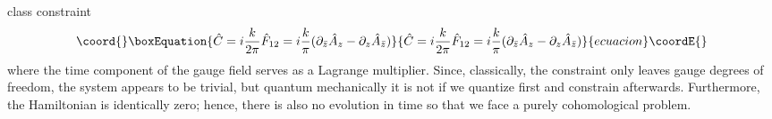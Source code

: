 \documentclass[a4paper,10pt]{article}
\begin{document}
class constraint 
\begin{equation}\coord{}\boxEquation{
\hat{C}=i\frac{k}{2\pi}\hat{F}_{12}=i\frac{k}{\pi}(\partial_{\bar{z}}\hat{A}_z
-\partial_z\hat{A}_{\bar{z}})
}{
\hat{C}=i\frac{k}{2\pi}\hat{F}_{12}=i\frac{k}{\pi}(\partial_{\bar{z}}\hat{A}_z
-\partial_z\hat{A}_{\bar{z}})
}{ecuacion}\coordE{}\end{equation}
where the time component \coordHE{} of the gauge field serves as a Lagrange multiplier. Since,  
classically, the constraint \coordHE{} only leaves gauge degrees of freedom, the system 
appears to be trivial, but quantum mechanically it is not if we quantize first and 
constrain afterwards. Furthermore, the Hamiltonian is identically zero; hence, there is 
also no evolution in time so that we face a purely cohomological problem. 
\end{document}
